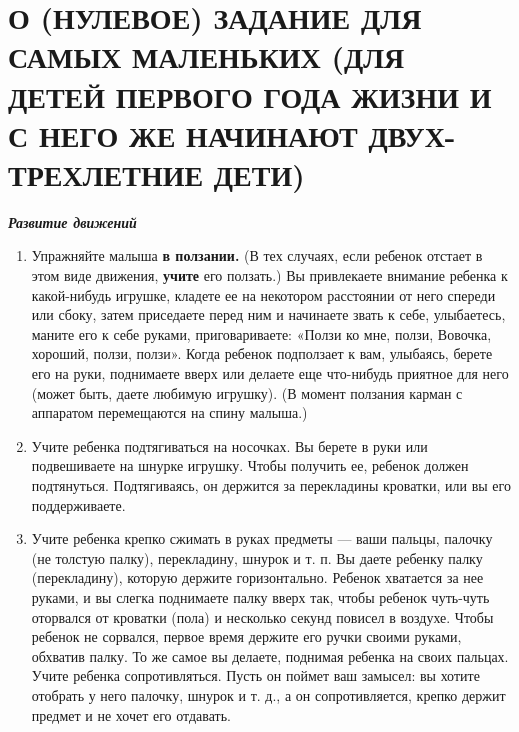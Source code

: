 \documentclass{book}
\newcounter{structure}
\renewcommand{\emph}[1]{\textit{#1}}
\begin{document}
\textbf{\hfill\break
}



\section{О (НУЛЕВОЕ) ЗАДАНИЕ ДЛЯ САМЫХ МАЛЕНЬКИХ (ДЛЯ ДЕТЕЙ ПЕРВОГО ГОДА ЖИЗНИ И С НЕГО ЖЕ НАЧИНАЮТ ДВУХ-ТРЕХЛЕТНИЕ ДЕТИ)}

\emph{\textbf{Развитие движений}}

\begin{enumerate}
\def\labelenumi{\arabic{enumi}.}
\item Упражняйте малыша \textbf{в ползании.} (В тех случаях, если ребенок
отстает в этом виде движения, \textbf{учите} его ползать.) Вы
привлекаете внимание ребенка к какой-нибудь игрушке, кладете ее на
некотором расстоянии от него спереди или сбоку, затем приседаете перед
ним и начинаете звать к себе, улыбаетесь, маните его к себе руками,
приговариваете: «Ползи ко мне, ползи, Вовочка, хороший, ползи, ползи».
Когда ребенок подползает к вам, улыбаясь, берете его на руки, поднимаете
вверх или делаете еще что-нибудь приятное для него (может быть, даете
любимую игрушку). (В момент ползания карман с аппаратом перемещаются на
спину малыша.)

\item
  
  Учите ребенка подтягиваться на носочках. Вы берете в руки или
  подвешиваете на шнурке игрушку. Чтобы получить ее, ребенок должен
  подтянуться. Подтягиваясь, он держится за перекладины кроватки, или вы
  его поддерживаете.
  
\item
  
  Учите ребенка крепко сжимать в руках предметы --- ваши пальцы, палочку
  (не толстую палку), перекладину, шнурок и т. п. Вы даете ребенку палку
  (перекладину), которую держите горизонтально. Ребенок хватается за нее
  руками, и вы слегка поднимаете палку вверх так, чтобы ребенок
  чуть-чуть оторвался от кроватки (пола) и несколько секунд повисел в
  воздухе. Чтобы ребенок не сорвался, первое время держите его ручки
  своими руками, обхватив палку. То же самое вы делаете, поднимая
  ребенка на своих пальцах. Учите ребенка сопротивляться. Пусть он
  поймет ваш замысел: вы хотите отобрать у него палочку, шнурок и т. д.,
  а он сопротивляется, крепко держит предмет и не хочет его отдавать.
  
\end{enumerate}
\end{document}
